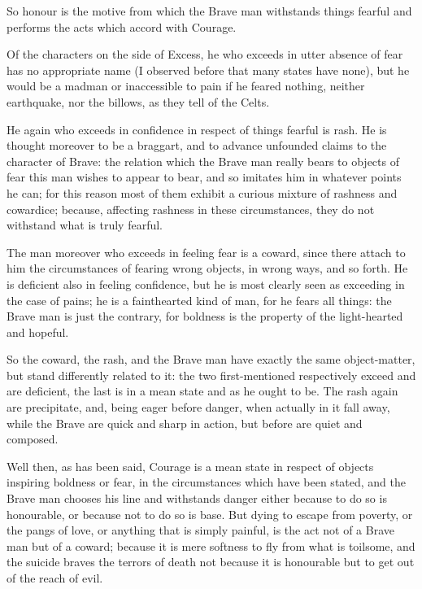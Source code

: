 So honour is the motive from which the Brave man withstands things fearful and
performs the acts which accord with Courage.

Of the characters on the side of Excess, he who exceeds in utter absence of
fear has no appropriate name (I observed before that many states have none),
but he would be a madman or inaccessible to pain if he feared nothing, neither
earthquake, nor the billows, as they tell of the Celts.

He again who exceeds in confidence in respect of things fearful is rash. He is
thought moreover to be a braggart, and to advance unfounded claims to the
character of Brave: the relation which the Brave man really bears to objects of
fear this man wishes to appear to bear, and so imitates him in whatever points
he can; for this reason most of them exhibit a curious mixture of rashness and
cowardice; because, affecting rashness in these circumstances, they do not
withstand what is truly fearful.

The man moreover who exceeds in feeling fear is a coward, since there attach to
him the circumstances of fearing wrong objects, in wrong ways, and so forth. He
is deficient also in feeling confidence, but he is most clearly seen as
exceeding in the case of pains; he is a fainthearted kind of man, for he fears
all things: the Brave man is just the contrary, for boldness is the property of
the light-hearted and hopeful.

So the coward, the rash, and the Brave man have exactly the same object-matter,
but stand differently related to it: the two first-mentioned respectively
exceed and are deficient, the last is in a mean state and as he ought to be.
The rash again are precipitate, and, being eager before danger, when actually
in it fall away, while the Brave are quick and sharp in action, but before are
quiet and composed.

Well then, as has been said, Courage is a mean state in respect of objects
inspiring boldness or fear, in the circumstances which have been stated, and
the Brave man chooses his line and withstands danger either because to do so is
honourable, or because not to do so is base. But dying to escape from poverty,
or the pangs of love, or anything that is simply painful, is the act not of a
Brave man but of a coward; because it is mere softness to fly from what is
toilsome, and the suicide braves the terrors of death not because it is
honourable but to get out of the reach of evil.



